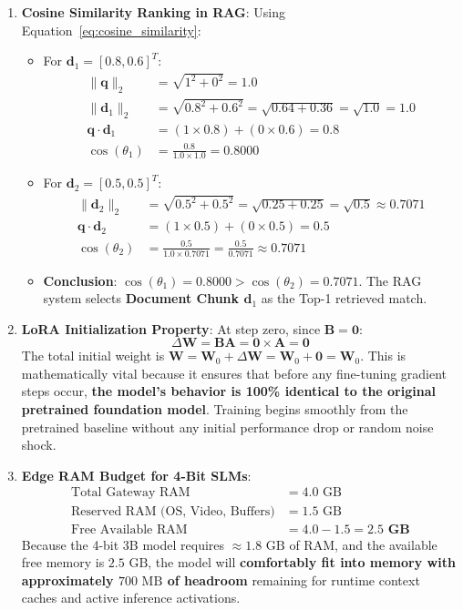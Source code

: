 \begin{enumerate}
    \item \textbf{Cosine Similarity Ranking in RAG}:
    Using Equation~\eqref{eq:cosine_similarity}:
    \begin{itemize}
        \item For $\mathbf{d}_1 = [0.8, 0.6]^T$:
        \begin{align*}
        \|\mathbf{q}\|_2 &= \sqrt{1^2 + 0^2} = 1.0 \\
        \|\mathbf{d}_1\|_2 &= \sqrt{0.8^2 + 0.6^2} = \sqrt{0.64 + 0.36} = \sqrt{1.0} = 1.0 \\
        \mathbf{q} \cdot \mathbf{d}_1 &= (1 \times 0.8) + (0 \times 0.6) = 0.8 \\
        \cos(\theta_1) &= \frac{0.8}{1.0 \times 1.0} = \mathbf{0.8000}
        \end{align*}
        \item For $\mathbf{d}_2 = [0.5, 0.5]^T$:
        \begin{align*}
        \|\mathbf{d}_2\|_2 &= \sqrt{0.5^2 + 0.5^2} = \sqrt{0.25 + 0.25} = \sqrt{0.5} \approx 0.7071 \\
        \mathbf{q} \cdot \mathbf{d}_2 &= (1 \times 0.5) + (0 \times 0.5) = 0.5 \\
        \cos(\theta_2) &= \frac{0.5}{1.0 \times 0.7071} = \frac{0.5}{0.7071} \approx \mathbf{0.7071}
        \end{align*}
        \item \textbf{Conclusion}: $\cos(\theta_1) = 0.8000 > \cos(\theta_2) = 0.7071$. The RAG system selects \textbf{Document Chunk $\mathbf{d}_1$} as the Top-1 retrieved match.
    \end{itemize}

    \item \textbf{LoRA Initialization Property}:
    At step zero, since $\mathbf{B} = \mathbf{0}$:
    \begin{equation*}
    \Delta \mathbf{W} = \mathbf{B} \mathbf{A} = \mathbf{0} \times \mathbf{A} = \mathbf{0}
    \end{equation*}
    The total initial weight is $\mathbf{W} = \mathbf{W}_0 + \Delta \mathbf{W} = \mathbf{W}_0 + \mathbf{0} = \mathbf{W}_0$.
    This is mathematically vital because it ensures that before any fine-tuning gradient steps occur, \textbf{the model's behavior is 100\% identical to the original pretrained foundation model}. Training begins smoothly from the pretrained baseline without any initial performance drop or random noise shock.

    \item \textbf{Edge RAM Budget for 4-Bit SLMs}:
    \begin{align*}
    \text{Total Gateway RAM} &= 4.0 \text{ GB} \\
    \text{Reserved RAM (OS, Video, Buffers)} &= 1.5 \text{ GB} \\
    \text{Free Available RAM} &= 4.0 - 1.5 = \mathbf{2.5 \text{ GB}}
    \end{align*}
    Because the 4-bit 3B model requires $\approx 1.8\text{ GB}$ of RAM, and the available free memory is $2.5\text{ GB}$, the model will \textbf{comfortably fit into memory with approximately $700\text{ MB}$ of headroom} remaining for runtime context caches and active inference activations.
\end{enumerate}

